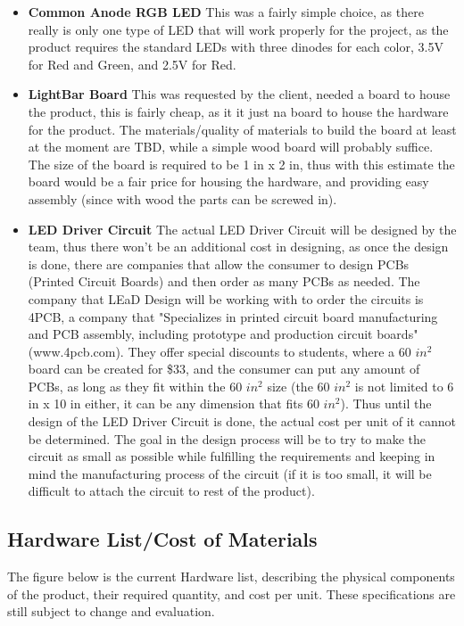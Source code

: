 \documentclass[12pt]{article}
\begin{document}
{{{{{{{{\begin{itemize}
				\item \textbf{Common Anode RGB LED}
				This was a fairly simple choice, as there really is only one type of LED that will work properly for the project, as the product requires the standard LEDs with three dinodes for each color, 3.5V for Red and Green, and 2.5V for Red.
				\item \textbf{LightBar Board}
				This was requested by the client, needed a board to house the product, this is fairly cheap, as it it just na board to house the hardware for the product. The materials/quality of materials to build the board at least at the moment are TBD, while a simple wood board will probably suffice. The size of the board is required to be 1 in x 2 in, thus with this estimate the board would be a fair price for housing the hardware, and providing easy assembly (since with wood the parts can be screwed in).	
				\item \textbf{LED Driver Circuit}
				The actual LED Driver Circuit will be designed by the team, thus there won't be an additional cost in designing, as once the design is done, there are companies that allow the consumer to design PCBs (Printed Circuit Boards) and then order as many PCBs as needed. The company that LEaD Design will be working with to order the circuits is 4PCB, a company that "Specializes in printed circuit board manufacturing and PCB assembly, including prototype and production circuit boards" (www.4pcb.com). They offer special discounts to students, where a 60 $in^2$ board can be created for \$33, and the consumer can put any amount of PCBs, as long as they fit within the 60 $in^2$ size (the 60 $in^2$ is not limited to 6 in x 10 in either, it can be any dimension that fits 60 $in^2$). Thus until the design of the LED Driver Circuit is done, the actual cost per unit of it cannot be determined. The goal in the design process will be to try to make the circuit as small as possible while fulfilling the requirements and keeping in mind the manufacturing process of the circuit (if it is too small, it will be difficult to attach the circuit to rest of the product).
			\end{itemize}
			
			\subsection{Hardware List/Cost of Materials}
			The figure below is the current Hardware list, describing the physical components of the product, their required quantity, and cost per unit. These specifications are still subject to change and evaluation.
			
}}}}}}}}
\end{document}
